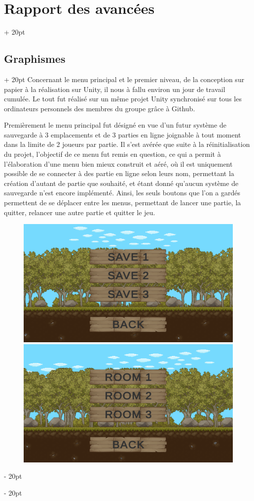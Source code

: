 \documentclass[a4paper, 12pt, twoside]{article}
\newcommand{\ind}[1][20pt]{\advance\leftskip + #1}
\newcommand{\deind}[1][20pt]{\advance\leftskip - #1}
\newenvironment{indt}[2][20pt]{#2 \par \ind[#1]}{\par \deind} %
\begin{document}
\begin{indt}{\section{Rapport des avancées}}
\begin{indt}{\subsection{Graphismes}}
            Concernant le menu principal et le premier niveau, de la conception sur papier à la réalisation sur Unity, il nous à fallu environ un jour de travail cumulée. Le tout fut réalisé sur un même projet Unity synchronisé sur tous les ordinateurs personnels des membres du groupe grâce à Github.

            Premièrement le menu principal fut désigné en vue d'un futur système de sauvegarde à 3 emplacements et de 3 parties en ligne joignable à tout moment dans la limite de 2 joueurs par partie. Il s'est avérée que suite à la réinitialisation du projet, l'objectif de ce menu fut remis en question, ce qui a permit à l'élaboration d'une menu bien mieux construit et aéré, où il est uniquement possible de se connecter à des partie en ligne selon leurs nom, permettant la création d'autant de partie que souhaité, et étant donné qu'aucun système de sauvegarde n'est encore implémenté. Ainsi, les seuls boutons que l'on a gardés permettent de se déplacer entre les menus, permettant de lancer une partie, la quitter, relancer une autre partie et quitter le jeu.

            \begin{figure}
                \includegraphics[width=0.49\linewidth]{MMV12.png}\hfill \hfill\includegraphics[width=0.49\linewidth]{MMV13.png}
            \end{figure}


\end{indt}
\end{indt}
\end{document}
